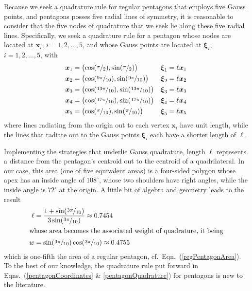     Because we seek a quadrature rule for regular pentagons that employs five Gauss points, and pentagons posses five radial lines of symmetry, it is reasonable to consider that the five nodes of quadrature that we seek lie along these five radial lines.  Specifically, we seek a quadrature rule for a pentagon whose nodes are located at $\boldsymbol{x}_i$, $i=1,2,\ldots,5$, and whose Gauss points are located at $\boldsymbol{\xi}_i$, $i=1,2,\ldots,5$, with
    \begin{subequations}
        \label{pentagonCoordinates}
        \begin{align}
        \boldsymbol{x}_1 & = \bigl( \cos ( \textfrac{\pi}{2} ) ,
        \sin ( \textfrac{\pi}{2} ) \bigr) & \boldsymbol{\xi}_1 & = \ell \boldsymbol{x}_1 \\
        \boldsymbol{x}_2 & = \bigl( \cos ( \textfrac{9\pi}{10}) ,
        \sin ( \textfrac{9\pi}{10} ) \bigr) & \boldsymbol{\xi}_2 & = \ell \boldsymbol{x}_2 \\
        \boldsymbol{x}_3 & = \bigl( \cos ( \textfrac{13\pi}{10}) ,
        \sin ( \textfrac{13\pi}{10} ) \bigr) & \boldsymbol{\xi}_3 & = \ell \boldsymbol{x}_3 \\
        \boldsymbol{x}_4 & = \bigl( \cos ( \textfrac{17\pi}{10}) ,
        \sin ( \textfrac{17\pi}{10} ) \bigr) & \boldsymbol{\xi}_4 & = \ell \boldsymbol{x}_4 \\
        \boldsymbol{x}_5 & = \bigl( \cos ( \textfrac{\pi}{10}) ,
        \sin ( \textfrac{\pi}{10} ) \bigr) & \boldsymbol{\xi}_5 & = \ell \boldsymbol{x}_5
        \end{align}
    \end{subequations}
    where lines radiating from the origin out to each vertex $\boldsymbol{x}_i$ have unit length, while the lines that radiate out to the Gauss points $\boldsymbol{\xi}_i$ each have a shorter length of $\ell$.
    
    Implementing the strategies that underlie Gauss quadrature, length $\ell$ represents a distance from the pentagon's centroid out to the centroid of a quadrilateral.  In our case, this area (one of five equivalent areas) is a four-sided polygon whose apex has an inside angle of $108^{\circ}$, whose two shoulders have right angles, while the inside angle is $72^{\circ}$ at the origin.  A little bit of algebra and geometry leads to the result
    \begin{subequations}
        \label{pentagonQuadrature}
        \begin{align}
        \ell & = \frac{1 + \sin ( \textfrac{3\pi}{10} )}
        {3 \sin ( \textfrac{3\pi}{10} ) } \approx 0.7454 \\
        \intertext{whose area becomes the associated weight of quadrature, it being}
        w & = \sin ( \textfrac{3\pi}{10} ) \cos ( \textfrac{3\pi}{10} ) 
        \approx 0.4755 
        \end{align}
    \end{subequations}
    which is one-fifth the area of a regular pentagon, cf.\ Eqn.~(\ref{regPentagonArea}).  To the best of our knowledge, the quadrature rule put forward in Eqns.~(\ref{pentagonCoordinates} \& \ref{pentagonQuadrature}) for pentagons is new to the literature. 
    
